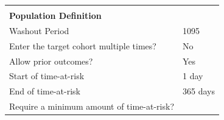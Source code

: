 \documentclass[
]{article}
\begin{document}
\begin{longtable}[]{@{}ll@{}}
\begin{minipage}[t]{0.42\columnwidth}
\strut
\end{minipage} & \begin{minipage}[t]{0.52\columnwidth}\raggedright
\strut
\end{minipage}\tabularnewline
\begin{minipage}[t]{0.42\columnwidth}\raggedright
\textbf{Population Definition}\strut
\end{minipage} & \begin{minipage}[t]{0.52\columnwidth}\raggedright
\strut
\end{minipage}\tabularnewline
\begin{minipage}[t]{0.42\columnwidth}\raggedright
Washout Period\strut
\end{minipage} & \begin{minipage}[t]{0.52\columnwidth}\raggedright
1095\strut
\end{minipage}\tabularnewline
\begin{minipage}[t]{0.42\columnwidth}\raggedright
Enter the target cohort multiple times?\strut
\end{minipage} & \begin{minipage}[t]{0.52\columnwidth}\raggedright
No\strut
\end{minipage}\tabularnewline
\begin{minipage}[t]{0.42\columnwidth}\raggedright
Allow prior outcomes?\strut
\end{minipage} & \begin{minipage}[t]{0.52\columnwidth}\raggedright
Yes\strut
\end{minipage}\tabularnewline
\begin{minipage}[t]{0.42\columnwidth}\raggedright
Start of time-at-risk\strut
\end{minipage} & \begin{minipage}[t]{0.52\columnwidth}\raggedright
1 day\strut
\end{minipage}\tabularnewline
\begin{minipage}[t]{0.42\columnwidth}\raggedright
End of time-at-risk\strut
\end{minipage} & \begin{minipage}[t]{0.52\columnwidth}\raggedright
365 days\strut
\end{minipage}\tabularnewline
\begin{minipage}[t]{0.42\columnwidth}\raggedright
Require a minimum amount of time-at-risk?\strut
\end{minipage} & \begin{minipage}[t]{0.52\columnwidth}\raggedright

\end{minipage}
\end{longtable}
\end{document}
